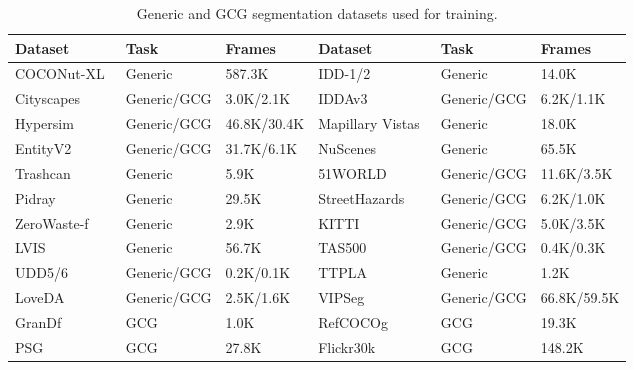 \begin{table}[htbp]
  \centering
  \small
  \setlength{\tabcolsep}{3pt}
  \renewcommand{\arraystretch}{0.88}
  \begin{tabular}{p{}|p{}|p{}||p{}|p{}|p{}}
    \toprule
    Dataset & Task & Frames & Dataset & Task & Frames \\
    \midrule
    COCONut-XL~\cite{coconut2024cvpr} & Generic & 587.3K
    & IDD-1/2~\cite{varma2019idd} & Generic & 14.0K \\
    Cityscapes~\cite{Cordts2016Cityscapes, Cordts2015Cvprw} & Generic/GCG & 3.0K/2.1K
    & IDDAv3~\cite{alberti2020idda} & Generic/GCG & 6.2K/1.1K \\
    Hypersim~\cite{roberts:2021} & Generic/GCG & 46.8K/30.4K
    & Mapillary Vistas~\cite{garg2025mapillaryvistasvalidationfinegrained} & Generic & 18.0K \\
    EntityV2~\cite{Qi_2023_EntitySeg} & Generic/GCG & 31.7K/6.1K
    & NuScenes~\cite{fong2021panoptic} & Generic & 65.5K \\
    Trashcan~\cite{hong2020trashcansemanticallysegmenteddatasetvisual} & Generic & 5.9K
    & 51WORLD~\cite{51world_dataone_synthetic_2025} & Generic/GCG & 11.6K/3.5K \\
    Pidray~\cite{zhang2022pidraylargescalexraybenchmark} & Generic & 29.5K
    & StreetHazards~\cite{hendrycks2019anomalyseg} & Generic/GCG & 6.2K/1.0K \\
    ZeroWaste-f~\cite{Bashkirova_2022_CVPR} & Generic & 2.9K
    & KITTI~\cite{step_2021} & Generic/GCG & 5.0K/3.5K \\
    LVIS~\cite{gupta2019lvis} & Generic & 56.7K
    & TAS500~\cite{metzger2021finegraineddatasetefficientsemantic} & Generic/GCG & 0.4K/0.3K \\
    UDD5/6~\cite{chen2018large} & Generic/GCG & 0.2K/0.1K
    & TTPLA~\cite{abdelfattah2020ttpla} & Generic & 1.2K \\
    LoveDA~\cite{Wang2021LoveDAAR} & Generic/GCG & 2.5K/1.6K
    & VIPSeg~\cite{miao2021vspw} & Generic/GCG & 66.8K/59.5K \\
    GranDf~\cite{Rasheed_2024_CVPR} & GCG & 1.0K
    & RefCOCOg~\cite{kazemzadeh-etal-2014-referitgame} & GCG & 19.3K \\
    PSG~\cite{yang2022psg} & GCG & 27.8K
    & Flickr30k~\cite{plummer2015flickr30k} & GCG & 148.2K \\
    \bottomrule
  \end{tabular}
  \caption{Generic and GCG segmentation datasets used for training.}
  \label{tab:seg-datasets-pan}
\end{table}

